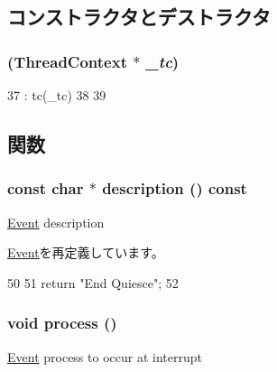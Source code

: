 \subsection{コンストラクタとデストラクタ}
\hypertarget{classEndQuiesceEvent_adcb034f824857d692a2e756553a7c9fc}{
\subsubsection[{EndQuiesceEvent}]{ ({\bf ThreadContext} $\ast$ {\em \_\-tc})}}
\label{classEndQuiesceEvent_adcb034f824857d692a2e756553a7c9fc}



\begin{DoxyCode}
37     : tc(_tc)
38 {
39 }
\end{DoxyCode}


\subsection{関数}
\hypertarget{classEndQuiesceEvent_a5a14fe478e2393ff51f02e9b7be27e00}{
\subsubsection[{description}]{\setlength{\rightskip}{0pt plus 5cm}const char $\ast$ description () const}}
\label{classEndQuiesceEvent_a5a14fe478e2393ff51f02e9b7be27e00}
\hyperlink{classEvent}{Event} description 

\hyperlink{classEvent_a130ddddf003422b413e2e891b1b80e8f}{Event}を再定義しています。


\begin{DoxyCode}
50 {
51     return "End Quiesce";
52 }
\end{DoxyCode}
\hypertarget{classEndQuiesceEvent_a2e9c5136d19b1a95fc427e0852deab5c}{
\subsubsection[{process}]{\setlength{\rightskip}{0pt plus 5cm}void process ()}}
\label{classEndQuiesceEvent_a2e9c5136d19b1a95fc427e0852deab5c}
\hyperlink{classEvent}{Event} process to occur at interrupt 

